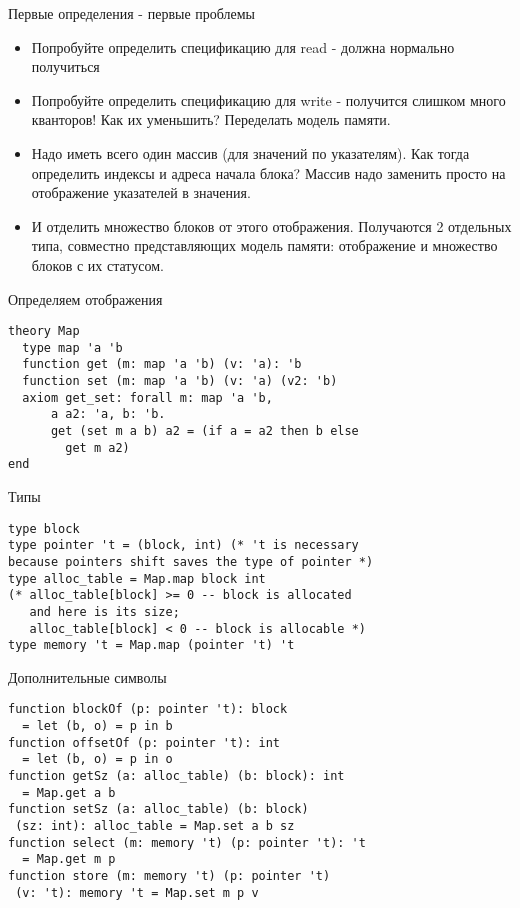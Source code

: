 \documentclass[hyperref={unicode=true}]{beamer}
\begin{document}
    \begin{frame}{Первые определения - первые проблемы}
    \begin{itemize}
    \item
    Попробуйте определить спецификацию для read - должна нормально получиться
    \item
    Попробуйте определить спецификацию для write - получится слишком
    много кванторов! Как их уменьшить? Переделать модель памяти.
    \item
    Надо иметь всего один массив (для значений по указателям).
    Как тогда определить индексы и адреса начала блока? Массив надо заменить
    просто на отображение указателей в значения.
    \item
    И отделить множество блоков от этого отображения. Получаются 2 отдельных
    типа, совместно представляющих модель памяти: отображение и множество блоков
    с их статусом.
    \end{itemize}
    \end{frame}

    \begin{frame}[fragile]{Определяем отображения}
    \begin{lstlisting}
theory Map
  type map 'a 'b
  function get (m: map 'a 'b) (v: 'a): 'b
  function set (m: map 'a 'b) (v: 'a) (v2: 'b)
  axiom get_set: forall m: map 'a 'b,
      a a2: 'a, b: 'b.
      get (set m a b) a2 = (if a = a2 then b else
        get m a2)
end
    \end{lstlisting}
    \end{frame}

    \begin{frame}[fragile]{Типы}
    \begin{lstlisting}
type block
type pointer 't = (block, int) (* 't is necessary
because pointers shift saves the type of pointer *)
type alloc_table = Map.map block int
(* alloc_table[block] >= 0 -- block is allocated
   and here is its size;
   alloc_table[block] < 0 -- block is allocable *)
type memory 't = Map.map (pointer 't) 't
    \end{lstlisting}
    \end{frame}

    \begin{frame}[fragile]{Дополнительные символы}
    \begin{lstlisting}
function blockOf (p: pointer 't): block
  = let (b, o) = p in b
function offsetOf (p: pointer 't): int
  = let (b, o) = p in o
function getSz (a: alloc_table) (b: block): int
  = Map.get a b
function setSz (a: alloc_table) (b: block)
 (sz: int): alloc_table = Map.set a b sz
function select (m: memory 't) (p: pointer 't): 't
  = Map.get m p
function store (m: memory 't) (p: pointer 't)
 (v: 't): memory 't = Map.set m p v
    \end{lstlisting}
    \end{frame}
\end{document}
